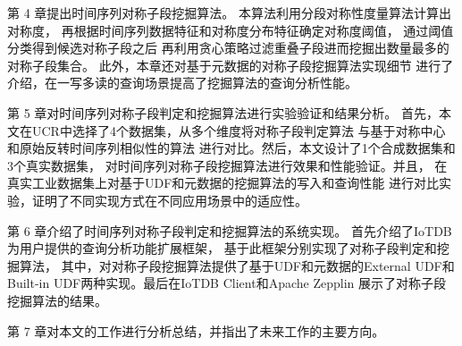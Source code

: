 
第 4 章提出时间序列对称子段挖掘算法。
本算法利用分段对称性度量算法计算出对称度，
再根据时间序列数据特征和对称度分布特征确定对称度阈值，
通过阈值分类得到候选对称子段之后
再利用贪心策略过滤重叠子段进而挖掘出数量最多的对称子段集合。
此外，本章还对基于元数据的对称子段挖掘算法实现细节
进行了介绍，在一写多读的查询场景提高了挖掘算法的查询分析性能。

第 5 章对时间序列对称子段判定和挖掘算法进行实验验证和结果分析。
首先，本文在UCR中选择了4个数据集，从多个维度将对称子段判定算法
与基于对称中心和原始反转时间序列相似性的算法
进行对比。然后，本文设计了1个合成数据集和3个真实数据集，
对时间序列对称子段挖掘算法进行效果和性能验证。并且，
在真实工业数据集上对基于UDF和元数据的挖掘算法的写入和查询性能
进行对比实验，证明了不同实现方式在不同应用场景中的适应性。

第 6 章介绍了时间序列对称子段判定和挖掘算法的系统实现。
首先介绍了IoTDB为用户提供的查询分析功能扩展框架，
基于此框架分别实现了对称子段判定和挖掘算法，
其中，对对称子段挖掘算法提供了基于UDF和元数据的External UDF和
Built-in UDF两种实现。最后在IoTDB Client和Apache Zepplin
\cite{DBLP:conf/xsede/ChengLJXC18}
展示了对称子段挖掘算法的结果。

第 7 章对本文的工作进行分析总结，并指出了未来工作的主要方向。 
